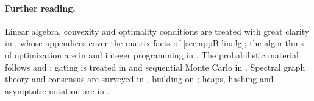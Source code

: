 \paragraph{Further reading.}
Linear algebra, convexity and optimality conditions are treated with great
clarity in \textcite{boyd2004convex}, whose appendices cover the matrix facts
of \cref{sec:appB-linalg}; the algorithms of optimization are in
\textcite{nocedal2006numerical} and integer programming in
\textcite{wolsey1998integer}. The probabilistic material follows
\textcite{thrun2005probabilistic} and \textcite{sarkka2013bayesian}; gating is
treated in \textcite{barshalom2001estimation} and sequential Monte Carlo in
\textcite{doucet2001sequential}. Spectral graph theory and consensus are
surveyed in \textcite{olfatisaber2007consensus}, building on
\textcite{fiedler1973algebraic}; heaps, hashing and asymptotic notation are in
\textcite{cormen2009clrs}.

